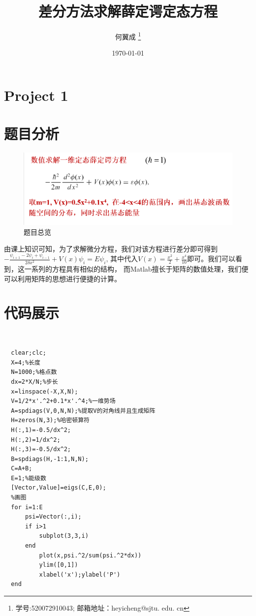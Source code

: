 \documentclass[UTF8,a4paper,10pt]{ctexart}
\title{\textbf{差分方法求解薛定谔定态方程}}
\author{ 何翼成 \thanks{学号:520072910043; \newline
    邮箱地址：heyicheng@sjtu. edu. cn} }
\date{\today}
\begin{document}
\maketitle

\section*{Project 1}
\section{题目分析}
	\begin{figure}[!htbp]
		\centering
		\includegraphics[width=1\textwidth,height=0.3\textwidth]{pictures/project.png}
		\caption{题目总览} \label{project}
	\end{figure}

由课上知识可知，为了求解微分方程，我们对该方程进行差分即可得到
$-\frac{\psi_{i+1}-2\psi_{i}+\psi_{i-1}}{2\delta x^2}+V(x)\psi_{i}=E\psi_{i}$,
其中代入$V(x)=\frac{x^2}{2}+\frac{x^4}{10}$即可。我们可以看到，这一系列的方程具有相似的结构，
而Matlab擅长于矩阵的数值处理，我们便可以利用矩阵的思想进行便捷的计算。


\section{代码展示}
~\\
\lstset{language=matlab}
\begin{lstlisting}
  clear;clc;
  X=4;%长度
  N=1000;%格点数
  dx=2*X/N;%步长
  x=linspace(-X,X,N);
  V=1/2*x'.^2+0.1*x'.^4;%一维势场
  A=spdiags(V,0,N,N);%提取V的对角线并且生成矩阵
  H=zeros(N,3);%哈密顿算符
  H(:,1)=-0.5/dx^2;
  H(:,2)=1/dx^2;
  H(:,3)=-0.5/dx^2;
  B=spdiags(H,-1:1,N,N);
  C=A+B;
  E=1;%能级数
  [Vector,Value]=eigs(C,E,0);
  %画图
  for i=1:E
      psi=Vector(:,i);
      if i>1
          subplot(3,3,i)
      end
          plot(x,psi.^2/sum(psi.^2*dx))
          ylim([0,1])
          xlabel('x');ylabel('P')
  end
\end{lstlisting}
\end{document}
